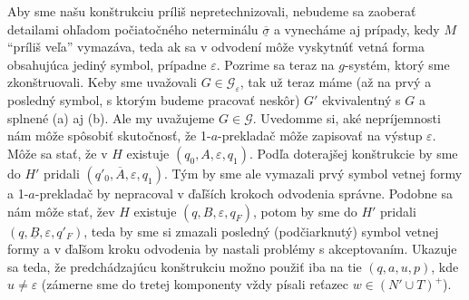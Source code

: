 \begin{dokaz}
\begin{enumerate}
  Aby sme našu konštrukciu príliš nepretechnizovali, nebudeme sa
  zaoberať detailami oh\-ľa\-dom počiatočného neterminálu
  $\underline{\overline{\sigma}}$ a vynecháme aj prípady, kedy $M$
  ``príliš veľa'' vymazáva, teda ak sa v odvodení môže vyskytnúť
  vetná forma obsahujúca jediný symbol, prípadne $\varepsilon$.
  Pozrime sa teraz na $g$-systém, ktorý sme zkonštruovali. Keby sme
  uvažovali $G\in\mathcal{G_{\varepsilon}}$, tak už teraz máme (až
  na prvý a posledný symbol, s ktorým budeme pracovať neskôr) $G'$
  ekvivalentný s $G$ a splnené (a) aj (b). Ale my uvažujeme
  $G\in\mathcal{G}$. Uvedomme si, aké nepríjemnosti nám môže
  spôsobiť skutočnosť, že 1-$a$-prekladač môže zapisovať na výstup
  $\varepsilon$. Môže sa stať, že v $H$ existuje
  $(q_0,A,\varepsilon,q_1)$. Podľa doterajšej konštrukcie by sme do
  $H'$ pridali $(q'_0,\overline{A},\varepsilon,q_1)$. Tým by sme ale
  vymazali prvý symbol vetnej formy a 1-$a$-prekladač by nepracoval
  v ďaľších krokoch odvodenia správne. Podobne sa nám môže stať,
  že\linebreak v $H$ existuje $(q,B,\varepsilon,q_F)$, potom by sme
  do $H'$ pridali $(q,\underline{B},\varepsilon,q'_F)$, teda by sme
  si zmazali posledný (podčiarknutý) symbol vetnej formy a v ďaľšom
  kroku odvodenia by nastali problémy s akceptovaním. Ukazuje sa
  teda, že predchádzajúcu konštrukciu možno použiť iba na tie
  $(q,a,u,p)$, kde $u\neq\varepsilon$ (zámerne sme do tretej
  komponenty vždy písali reťazec $w\in(N'\cup T)^+$).


\end{enumerate}
\end{dokaz}
